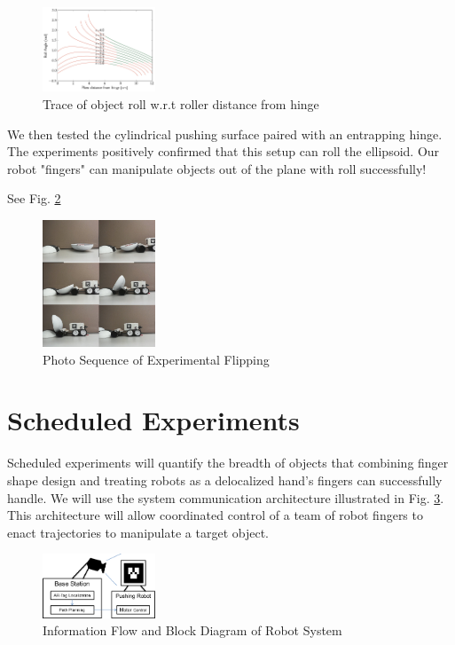\documentclass[runningheads,a4paper]{llncs}
\begin{document}
\begin{figure}[h!]
\centering
\includegraphics[width=0.3\textwidth]{RollerFlipTrace.png}
\caption{\label{fig:roller}Trace of object roll w.r.t roller distance from hinge}
\end{figure}

We then tested the cylindrical pushing surface paired with an entrapping hinge.
The experiments positively confirmed that this setup can roll the ellipsoid.
Our robot "fingers" can manipulate objects out of the plane with roll successfully!

See Fig. \ref{fig:photos}

\begin{figure}[h!]
\centering
\includegraphics[width=0.3\textwidth]{Photo_Sequence.jpg}
\caption{\label{fig:photos}Photo Sequence of Experimental Flipping}
\end{figure}

\clearpage
\section{Scheduled Experiments}
Scheduled experiments will quantify the breadth of objects that combining finger shape design and treating robots as a delocalized hand's fingers can successfully handle.
We will use the system communication architecture illustrated in Fig. \ref{fig:system}.
This architecture will allow coordinated control of a team of robot fingers to enact trajectories to manipulate a target object.

\begin{figure}[h!]
\centering
\includegraphics[width=0.3\textwidth]{System_Block_Diagram.png}
\caption{\label{fig:system}Information Flow and Block Diagram of Robot System}
\end{figure}
\end{document}
